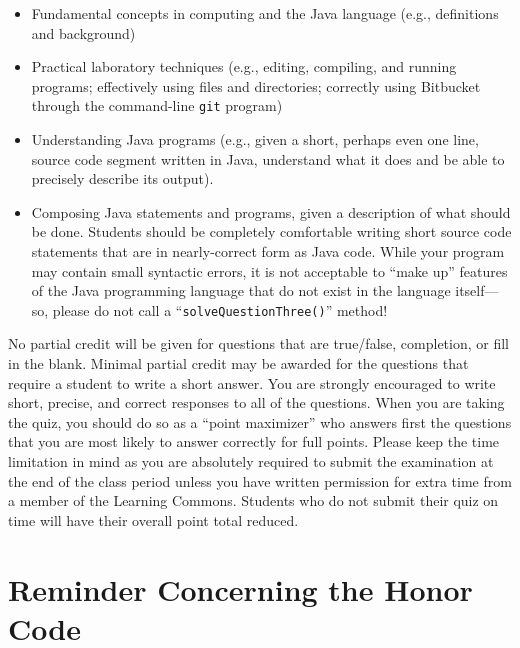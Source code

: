 \vspace*{-.05in}
\begin{itemize}

  \itemsep 0in

\item Fundamental concepts in computing and the Java language (e.g., definitions and background)

\item Practical laboratory techniques (e.g., editing, compiling, and running programs; effectively using files and
  directories; correctly using Bitbucket through the command-line {\tt git} program)

\item Understanding Java programs (e.g., given a short, perhaps even one line, source code segment written in Java,
  understand what it does and be able to precisely describe its output).

\item Composing Java statements and programs, given a description of what should be done. Students should be completely
  comfortable writing short source code statements that are in nearly-correct form as Java code. While your program may
  contain small syntactic errors, it is not acceptable to ``make up'' features of the Java programming language that do
  not exist in the language itself---so, please do not call a ``{\tt solveQuestionThree()}'' method!

\end{itemize}

\noindent No partial credit will be given for questions that are true/false, completion, or fill in the blank. Minimal
partial credit may be awarded for the questions that require a student to write a short answer. You are strongly
encouraged to write short, precise, and correct responses to all of the questions. When you are taking the quiz, you
should do so as a ``point maximizer'' who answers first the questions that you are most likely to answer correctly for
full points. Please keep the time limitation in mind as you are absolutely required to submit the examination at the end
of the class period unless you have written permission for extra time from a member of the Learning Commons. Students
who do not submit their quiz on time will have their overall point total reduced.

\section*{Reminder Concerning the Honor Code}


